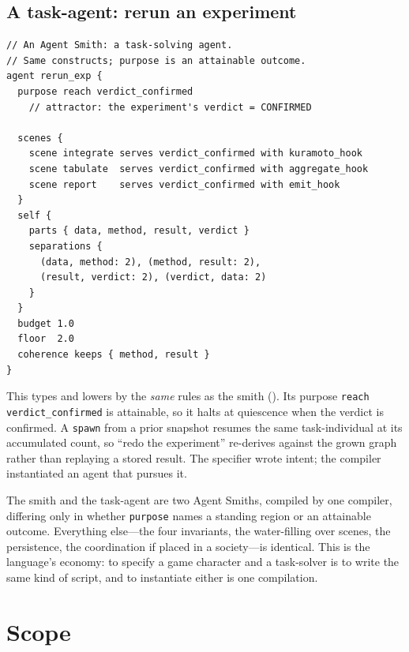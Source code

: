 \documentclass[11pt,twocolumn,a4paper]{article}
\begin{document}
\subsection{A task-agent: rerun an experiment}

\begin{lstlisting}
// An Agent Smith: a task-solving agent.
// Same constructs; purpose is an attainable outcome.
agent rerun_exp {
  purpose reach verdict_confirmed
    // attractor: the experiment's verdict = CONFIRMED

  scenes {
    scene integrate serves verdict_confirmed with kuramoto_hook
    scene tabulate  serves verdict_confirmed with aggregate_hook
    scene report    serves verdict_confirmed with emit_hook
  }
  self {
    parts { data, method, result, verdict }
    separations {
      (data, method: 2), (method, result: 2),
      (result, verdict: 2), (verdict, data: 2)
    }
  }
  budget 1.0
  floor  2.0
  coherence keeps { method, result }
}
\end{lstlisting}

\noindent This types and lowers by the \emph{same} rules as the smith
(). Its purpose \texttt{reach verdict\_confirmed} is
attainable, so it halts at quiescence when the verdict is confirmed. A
\texttt{spawn} from a prior snapshot resumes the same task-individual at its
accumulated count, so ``redo the experiment'' re-derives against the grown
graph rather than replaying a stored result. The specifier wrote intent; the
compiler instantiated an agent that pursues it.

\begin{remark}
\label{rem:same-smith}
The smith and the task-agent are two Agent Smiths, compiled by one compiler,
differing only in whether \texttt{purpose} names a standing region or an
attainable outcome. Everything else---the four invariants, the water-filling
over scenes, the persistence, the coordination if placed in a society---is
identical. This is the language's economy: to specify a game character and a
task-solver is to write the same kind of script, and to instantiate either is
one compilation.
\end{remark}

\section{Scope}
\label{sec:scope}
\end{document}
